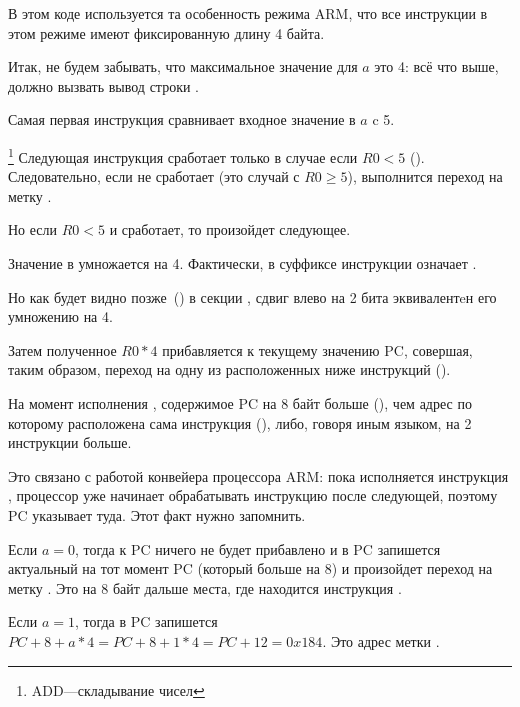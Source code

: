 \label{sec:SwitchARMLot}



В этом коде используется та особенность режима ARM, 
что все инструкции в этом режиме имеют фиксированную длину 4 байта.

Итак, не будем забывать, что максимальное значение для $a$ это 4: всё что выше, должно вызвать
вывод строки .

Самая первая инструкция  сравнивает входное значение в $a$ c 5.

\footnote{ADD---складывание чисел}
Следующая инструкция  сработает только в случае если $R0 < 5$ (). 
Следовательно, если  не сработает (это случай с $R0 \geq 5$), выполнится переход на метку 
.

Но если $R0 < 5$ и  сработает, то произойдет следующее.

Значение в  умножается на 4.
Фактически,  в суффиксе инструкции означает .

Но как будет видно позже~() в секции \q{\ShiftsSectionName}, 
сдвиг влево на 2 бита эквивалентeн его умножению на 4.

Затем полученное $R0*4$ прибавляется к текущему значению \ac{PC}, 
совершая, таким образом, переход на одну из расположенных ниже инструкций  ().

На момент исполнения ,
содержимое \ac{PC} на 8 байт больше (), чем адрес по которому расположена сама инструкция  (), 
либо, говоря иным языком, на 2 инструкции больше.

Это связано с работой конвейера процессора ARM:
пока исполняется инструкция , процессор уже начинает обрабатывать инструкцию после следующей, 
поэтому \ac{PC} указывает туда. Этот факт нужно запомнить.

Если $a=0$, тогда к \ac{PC} ничего не будет прибавлено и 
в \ac{PC} запишется актуальный на тот момент \ac{PC} (который больше на 8) 
и произойдет переход на метку . 
Это на 8 байт дальше места, где находится инструкция .

Если $a=1$, тогда в \ac{PC} запишется 
$PC+8+a*4 = PC+8+1*4 = PC+12 = 0x184$. Это адрес метки .

